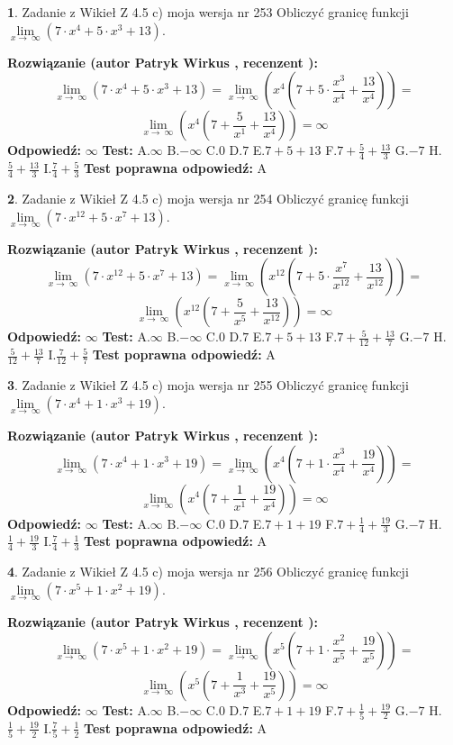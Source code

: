 \documentclass[12pt, a4paper]{article}
\theoremstyle{definition} %
\newtheorem{zad}{}
\newcommand{\zadStart}[1]{\begin{zad}#1\newline}
\newcommand{\zadStop}{\end{zad}}
\newcommand{\rozwStart}[2]{\noindent \textbf{Rozwiązanie (autor #1 , recenzent #2): }\newline}
\newcommand{\rozwStop}{\newline}
\newcommand{\odpStart}{\noindent \textbf{Odpowiedź:}\newline}
\newcommand{\odpStop}{\newline}
\newcommand{\testStart}{\noindent \textbf{Test:}\newline}
\newcommand{\testStop}{\newline}
\newcommand{\kluczStart}{\noindent \textbf{Test poprawna odpowiedź:}\newline}
\newcommand{\kluczStop}{\newline}
\begin{document}
\zadStart{Zadanie z Wikieł Z 4.5 c) moja wersja nr 253}
Obliczyć granicę funkcji  $\lim\limits_{x\to\ \infty}(7 \cdot x^{4}+5 \cdot x^{3}+13)$.
\zadStop
\rozwStart{Patryk Wirkus}{}
$$\lim\limits_{x\to\ \infty}(7 \cdot x^{4}+5 \cdot x^{3}+13) = \lim\limits_{x\to\ \infty}(x^{4}(7 +5 \cdot \frac{x^{3}}{x^{4}}+\frac{13}{x^{4}})) =$$ $$\lim\limits_{x\to\ \infty}(x^{4}(7 +\frac{5}{x^{1}}+\frac{13}{x^{4}})) =\infty$$
\rozwStop
\odpStart
$\infty$
\odpStop
\testStart
A.$\infty$ B.$-\infty$ C.$0$ D.$7$ E.$7 + 5 + 13$
F.$7+\frac{5}{4}+\frac{13}{3}$ G.$-7$
H.$\frac{5}{4}+\frac{13}{3}$
I.$\frac{7}{4}+\frac{5}{3}$
\testStop
\kluczStart
A
\kluczStop



\zadStart{Zadanie z Wikieł Z 4.5 c) moja wersja nr 254}
Obliczyć granicę funkcji  $\lim\limits_{x\to\ \infty}(7 \cdot x^{12}+5 \cdot x^{7}+13)$.
\zadStop
\rozwStart{Patryk Wirkus}{}
$$\lim\limits_{x\to\ \infty}(7 \cdot x^{12}+5 \cdot x^{7}+13) = \lim\limits_{x\to\ \infty}(x^{12}(7 +5 \cdot \frac{x^{7}}{x^{12}}+\frac{13}{x^{12}})) =$$ $$\lim\limits_{x\to\ \infty}(x^{12}(7 +\frac{5}{x^{5}}+\frac{13}{x^{12}})) =\infty$$
\rozwStop
\odpStart
$\infty$
\odpStop
\testStart
A.$\infty$ B.$-\infty$ C.$0$ D.$7$ E.$7 + 5 + 13$
F.$7+\frac{5}{12}+\frac{13}{7}$ G.$-7$
H.$\frac{5}{12}+\frac{13}{7}$
I.$\frac{7}{12}+\frac{5}{7}$
\testStop
\kluczStart
A
\kluczStop



\zadStart{Zadanie z Wikieł Z 4.5 c) moja wersja nr 255}
Obliczyć granicę funkcji  $\lim\limits_{x\to\ \infty}(7 \cdot x^{4}+1 \cdot x^{3}+19)$.
\zadStop
\rozwStart{Patryk Wirkus}{}
$$\lim\limits_{x\to\ \infty}(7 \cdot x^{4}+1 \cdot x^{3}+19) = \lim\limits_{x\to\ \infty}(x^{4}(7 +1 \cdot \frac{x^{3}}{x^{4}}+\frac{19}{x^{4}})) =$$ $$\lim\limits_{x\to\ \infty}(x^{4}(7 +\frac{1}{x^{1}}+\frac{19}{x^{4}})) =\infty$$
\rozwStop
\odpStart
$\infty$
\odpStop
\testStart
A.$\infty$ B.$-\infty$ C.$0$ D.$7$ E.$7 + 1 + 19$
F.$7+\frac{1}{4}+\frac{19}{3}$ G.$-7$
H.$\frac{1}{4}+\frac{19}{3}$
I.$\frac{7}{4}+\frac{1}{3}$
\testStop
\kluczStart
A
\kluczStop



\zadStart{Zadanie z Wikieł Z 4.5 c) moja wersja nr 256}
Obliczyć granicę funkcji  $\lim\limits_{x\to\ \infty}(7 \cdot x^{5}+1 \cdot x^{2}+19)$.
\zadStop
\rozwStart{Patryk Wirkus}{}
$$\lim\limits_{x\to\ \infty}(7 \cdot x^{5}+1 \cdot x^{2}+19) = \lim\limits_{x\to\ \infty}(x^{5}(7 +1 \cdot \frac{x^{2}}{x^{5}}+\frac{19}{x^{5}})) =$$ $$\lim\limits_{x\to\ \infty}(x^{5}(7 +\frac{1}{x^{3}}+\frac{19}{x^{5}})) =\infty$$
\rozwStop
\odpStart
$\infty$
\odpStop
\testStart
A.$\infty$ B.$-\infty$ C.$0$ D.$7$ E.$7 + 1 + 19$
F.$7+\frac{1}{5}+\frac{19}{2}$ G.$-7$
H.$\frac{1}{5}+\frac{19}{2}$
I.$\frac{7}{5}+\frac{1}{2}$
\testStop
\kluczStart
A
\kluczStop
\end{document}
